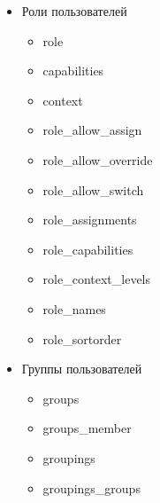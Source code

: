 \documentclass[a4paper, 14pt]{extarticle}
\begin{document}
\begin{itemize}
\begin{itemize}
            \item user\_private\_key
        \end{itemize}
    \item Роли пользователей
        \begin{itemize}
            \item role
            \item capabilities
            \item context
            \item role\_allow\_assign
            \item role\_allow\_override
            \item role\_allow\_switch
            \item role\_assignments
            \item role\_capabilities
            \item role\_context\_levels
            \item role\_names
            \item role\_sortorder
        \end{itemize} 
    \item Группы пользователей
        \begin{itemize}
            \item groups
            \item groups\_member
            \item groupings
            \item groupings\_groups
        \end{itemize}
\end{itemize}
\end{document}
